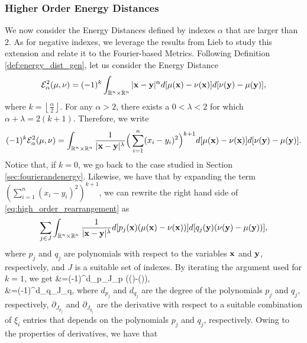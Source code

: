 \documentclass{article}
\newenvironment{equations}{\equation\aligned}{\endaligned\endequation}
\newcommand{\floor}[1]{\left\lfloor #1 \right\rfloor}
\def\bx{{\bf x}}
\def\by{{\bf y}}
\def\bxi{{\pmb\xi}}
\def \erre{\mathbb{R}}
\begin{document}
\subsubsection{Higher Order Energy Distances}
% 
We now consider the Energy Distances defined by indexes $\alpha$ that are larger than $2$.
% 
As for negative indexes, we leverage the results from Lieb to study this extension and relate it to the Fourier-based Metrics.
% 
Following Definition \ref{def:energy_dist_gen}, let us consider the Energy Distance
\begin{equation}
    \label{eq:energyalpahbig}
    \mathcal{E}^2_\alpha(\mu,\nu)=(-1)^{k}\int_{\erre^n\times\erre^n}|\bx-\by|^\alpha d[\mu(\bx)-\nu(\bx)]d[\nu(\by)-\mu(\by)],
\end{equation}
where $k=\floor{\frac{\alpha}{2}}$.
% 
For any $\alpha > 2$, there exists a $0<\lambda<2$ for which $\alpha+\lambda=2(k+1)$.
% 
Therefore, we write
\begin{equation}
    \label{eq:high_order_rearrangement}
    (-1)^{k}\mathcal{E}^2_\alpha(\mu,\nu)=\int_{\erre^n\times\erre^n}\frac{1}{|\bx-\by|^\lambda}\Big(\sum_{i=1}^n(x_i-y_i)^2\Big)^{k+1}d[\mu(\bx)-\nu(\bx)]d[\nu(\by)-\mu(\by)].
\end{equation}
Notice that, if $k=0$, we go back to the case studied in Section \ref{sec:fourierandenergy}.
% 
Likewise, we have that by expanding the term $(\sum_{i=1}^n(x_i-y_i)^2)^{k+1}$, we can rewrite the right hand side of \eqref{eq:high_order_rearrangement} as
% 
\[
\sum_{j\in J}\int_{\erre^n\times\erre^n}\frac{1}{|\bx-\by|^\lambda}d[p_j(\bx)(\mu(\bx)-\nu(\bx))]d[q_j(\by)(\nu(\by)-\mu(\by))],
\]
% 
where $p_j$ and $q_j$ are polynomials with respect to the variables $\bx$ and $\by$, respectively, and $J$ is a suitable set of indexes.
% 
By iterating the argument used for $k=1$, we get
\begin{equations}
    &\Big[{p_j(\bx)(\mu(\bx)-\nu(\bx))}\Big]=(-1)^{d_p}\partial_{J_p} (\hat\mu(\bxi)-\hat\nu(\bxi)),\\
    &\Big[\overline{\widehat{q_j(\by)(\nu(\by)-\mu(\by)}})\Big]=(-1)^{d_q}\partial_{J_q}\overline{(\hat\mu(\bxi)-\hat\nu(\bxi))},
\end{equations}
where $d_{p_j}$ and $d_{q_j}$ are the degree of the polynomials $p_j$ and $q_j$, respectively, $\partial_{J_{p_j}}$ and $\partial_{J_{q_j}}$ are the derivative with respect to a suitable combination of $\xi_i$ entries that depends on the polynomials $p_j$ and $q_j$, respectively.
% 
Owing to the properties of derivatives, we have that
\end{document}
